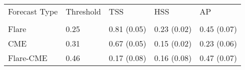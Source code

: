 \begin{tabular}{lllll}
\toprule
Forecast Type & Threshold & TSS & HSS & AP \\
 &  &  &  &  \\
\midrule
Flare & 0.25 & 0.81 (0.05) & 0.23 (0.02) & 0.45 (0.07) \\
CME & 0.31 & 0.67 (0.05) & 0.15 (0.02) & 0.23 (0.06) \\
Flare-CME & 0.46 & 0.17 (0.08) & 0.16 (0.08) & 0.47 (0.07) \\
\bottomrule
\end{tabular}
